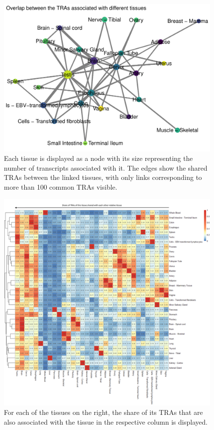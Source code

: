 \documentclass[
]{article}
\begin{document}
\begin{figure}
\centering
\includegraphics{final_report_files/figure-latex/tissue-links-1.pdf}
\caption{\label{fig:tissue-links}Each tissue is displayed as a node with its size representing the number of transcripts associated with it. The edges show the shared TRAs between the linked tissues, with only links corresponding to more than 100 common TRAs visible.}
\end{figure}

\begin{figure}
\centering
\includegraphics{final_report_files/figure-latex/heatmap-tissues-1.pdf}
\caption{\label{fig:heatmap-tissues}For each of the tissues on the right, the share of its TRAs that are also associated with the tissue in the respective column is displayed.}
\end{figure}
\end{document}
